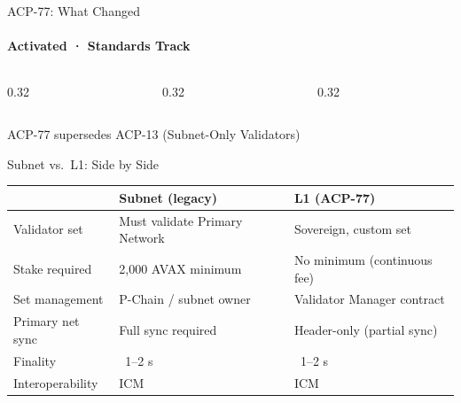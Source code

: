 \documentclass[aspectratio=169]{beamer}
\begin{document}
\begin{frame}{ACP-77: What Changed}
	\framesubtitle{Activated · Standards Track}

	\begin{columns}[t]
		\begin{column}{0.32\textwidth}
		\end{column}
		\begin{column}{0.32\textwidth}
		\end{column}
		\begin{column}{0.32\textwidth}
		\end{column}
	\end{columns}

	\vspace{0.5em}
	\begin{center}
		\small\textcolor{avagraydark}{ACP-77 supersedes ACP-13 (Subnet-Only Validators)}
	\end{center}
\end{frame}

\begin{frame}{Subnet vs.\ L1: Side by Side}
	\begin{center}
	\renewcommand{\arraystretch}{1.4}
	\begin{tabular}{@{} l >{\raggedright}p{4.5cm} >{\raggedright\arraybackslash}p{4.5cm} @{}}
		\toprule
		& \textbf{Subnet (legacy)} & \textbf{L1 (ACP-77)} \\
		\midrule
		Validator set    & Must validate Primary Network & Sovereign, custom set \\
		Stake required   & 2,000 AVAX minimum            & No minimum (continuous fee) \\
		Set management   & P-Chain / subnet owner        & Validator Manager contract \\
		Primary net sync & Full sync required            & Header-only (partial sync) \\
		Finality         & ~1–2 s                        & ~1–2 s \\
		Interoperability & ICM                           & ICM \\
		\bottomrule
	\end{tabular}
	\end{center}
\end{frame}
\end{document}
